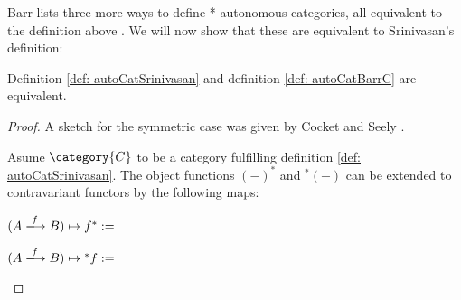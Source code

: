 \documentclass[DIN, pagenumber=false, fontsize=11pt, parskip=half, colorinlistoftodos, svgnames]{scrartcl}
\begin{document}
	Barr lists three more ways to define *-autonomous categories, all equivalent to the definition above \cite{barr95}. We will now show that these are equivalent to Srinivasan's definition:
	
	\begin{theorem}
		\label{equivalenceAutoCats}
		Definition \ref{def: autoCatSrinivasan} and definition \ref{def: autoCatBarrC} are equivalent.
	\end{theorem}
	
	\begin{proof}
		A sketch for the symmetric case was given by Cocket and Seely \cite[theorem 4.5]{cockett&seely97}. 
		
		Asume $\category{C}$ to be a category fulfilling definition \ref{def: autoCatSrinivasan}.
		The object functions $(-)^*$ and ${^*(-)}$ can be extended to contravariant functors by the following maps:
		
		\begin{center}
			$(A \xlongrightarrow{f} B) \mapsto f^* := \; $
		\end{center}
		
		\begin{center}
			$(A \xlongrightarrow{f} B) \mapsto {^*f} := \; $
		\end{center}
		

\end{proof}
\end{document}
